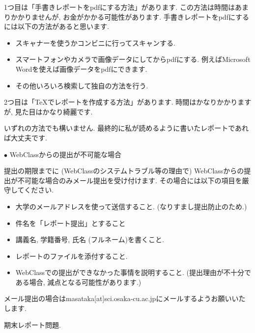 \documentclass[dvipdfmx,a4paper,11pt]{article}
\theoremstyle{definition}
\begin{document}
1つ目は「手書きレポートをpdfにする方法」があります.
この方法は時間はあまりかかりませんが, お金がかかる可能性があります.
手書きレポートをpdfにするには以下の方法があると思います.
\begin{itemize}
\setlength{\parskip}{0cm} %
  \setlength{\itemsep}{0cm}
\item スキャナーを使うかコンビニに行ってスキャンする.
\item スマートフォンやカメラで画像データにしてからpdfにする. 例えばMicrosoft Wordを使えば画像データをpdfにできます. %
\item その他いろいろ検索して独自の方法を行う.
\end{itemize}

2つ目は「TeXでレポートを作成する方法」があります.
時間はかなりかかりますが, 見た目はかなり綺麗です.
\vspace{11pt}


いずれの方法でも構いません. 最終的に私が読めるように書いたレポートであれば大丈夫です.

\vspace{11pt}
 \hspace{-11pt}
{\Large $\bullet$ WebClassからの提出が不可能な場合}
\vspace{11pt}

提出の期限までに (WebClassのシステムトラブル等の理由で) WebClassからの提出が不可能な場合のみメール提出を受け付けます.
その場合には以下の項目を厳守してください.
\begin{itemize}
\setlength{\parskip}{0cm} %
  \setlength{\itemsep}{0cm}
\item 大学のメールアドレスを使って送信すること. (なりすまし提出防止のため.)
\item 件名を「レポート提出」とすること
\item 講義名, 学籍番号, 氏名 (フルネーム)を書くこと.
\item レポートのファイルを添付すること.
\item WebClassでの提出ができなかった事情を説明すること. (提出理由が不十分である場合, 減点となる可能性があります.)
\end{itemize}

メール提出の場合はmasataka[at]sci.osaka-cu.ac.jpにメールするようお願いいたします.

\newpage

\newpage
\begin{center}
{\LARGE 期末レポート問題.} 
\end{center}
\end{document}

